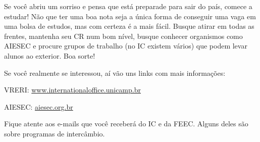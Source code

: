 Se você abriu um sorriso e pensa que está preparade para sair do país, comece a  estudar! Não que ter uma boa nota seja a única forma de conseguir uma vaga em uma  bolsa de estudos, mas com certeza é a mais fácil. Busque atirar em todas as frentes,  mantenha seu CR num bom nível, busque conhecer organismos como AIESEC e procure  grupos de trabalho (no IC existem vários) que podem levar alunos ao exterior. Boa sorte!

Se você realmente se interessou, aí vão uns links com mais informações:

VRERI: \url{www.internationaloffice.unicamp.br}

AIESEC: \url{aiesec.org.br} 

Fique atente aos e-mails que você receberá do IC e da FEEC. Alguns deles são sobre  programas de intercâmbio.
